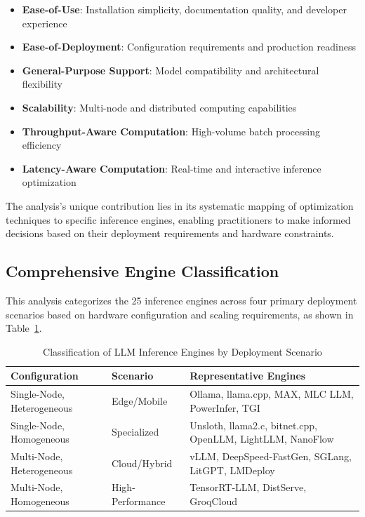 \documentclass[12pt,a4paper]{article}
\begin{document}
\begin{itemize}
    \item \textbf{Ease-of-Use}: Installation simplicity, documentation quality, and developer experience
    \item \textbf{Ease-of-Deployment}: Configuration requirements and production readiness
    \item \textbf{General-Purpose Support}: Model compatibility and architectural flexibility
    \item \textbf{Scalability}: Multi-node and distributed computing capabilities
    \item \textbf{Throughput-Aware Computation}: High-volume batch processing efficiency
    \item \textbf{Latency-Aware Computation}: Real-time and interactive inference optimization
\end{itemize}

The analysis's unique contribution lies in its systematic mapping of optimization techniques to specific inference engines, enabling practitioners to make informed decisions based on their deployment requirements and hardware constraints.

\subsection{Comprehensive Engine Classification}

This analysis categorizes the 25 inference engines across four primary deployment scenarios based on hardware configuration and scaling requirements, as shown in Table~\ref{tab:engine_classification}.

\begin{table}[htbp]
\centering
\caption{Classification of LLM Inference Engines by Deployment Scenario}
\label{tab:engine_classification}
\begin{tabular}{@{}p{4cm}p{4cm}p{8cm}@{}}
\toprule
\textbf{Configuration} & \textbf{Scenario} & \textbf{Representative Engines} \\
\midrule
Single-Node, Heterogeneous & Edge/Mobile & Ollama, llama.cpp, MAX, MLC LLM, PowerInfer, TGI \\
\addlinespace
Single-Node, Homogeneous & Specialized & Unsloth, llama2.c, bitnet.cpp, OpenLLM, LightLLM, NanoFlow \\
\addlinespace
Multi-Node, Heterogeneous & Cloud/Hybrid & vLLM, DeepSpeed-FastGen, SGLang, LitGPT, LMDeploy \\
\addlinespace
Multi-Node, Homogeneous & High-Performance & TensorRT-LLM, DistServe, GroqCloud \\
\bottomrule
\end{tabular}
\end{table}
\end{document}
